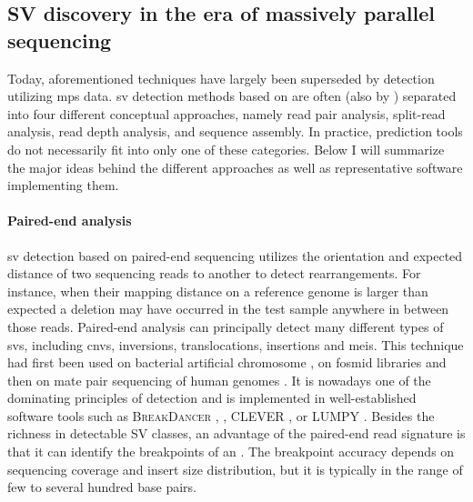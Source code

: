 \subsection{SV discovery in the era of massively parallel sequencing}
\label{sec:sv_detection_ngs}

Today, aforementioned techniques have largely been superseded by \sv detection
utilizing \acl{mps} data.
\Ac{sv} detection methods based on \mps are often (also by \cite{Alkan2011})
separated into four different conceptual approaches, namely read pair analysis,
split-read analysis, read depth analysis, and sequence assembly. In practice,
\sv prediction tools do not necessarily fit into only one of these categories.
Below I will summarize the major ideas behind the different approaches as well
as representative software implementing them.

\paragraph{Paired-end analysis}
\Ac{sv} detection based on paired-end sequencing utilizes the orientation and
expected distance of two sequencing reads to another to detect rearrangements.
For instance, when their mapping distance on a reference genome is larger than
expected a deletion may have occurred in the test sample anywhere in between
those reads. Paired-end analysis can principally detect many different types of
\acp{sv}, including \acp{cnv}, inversions, translocations, insertions and
\acp{mei}. This technique had first been used on bacterial artificial chromosome
\citep{Volik2003}, on fosmid libraries \citep{Tuzun2005} and then on mate pair
sequencing of human genomes \citep{Korbel2007}. It is nowadays one of the
dominating principles of \sv detection and is implemented in well-established
software tools such as \textsc{BreakDancer} \citep{Chen2009}, \delly,
\textsc{CLEVER} \citep{Marschall2012}, or \textsc{LUMPY} \citep{Layer2014}.
Besides the richness in detectable SV classes, an advantage of the paired-end
read signature is that it can identify the breakpoints of an \sv. The breakpoint
accuracy depends on sequencing coverage and insert size distribution, but
it is typically in the range of few to several hundred base pairs.

